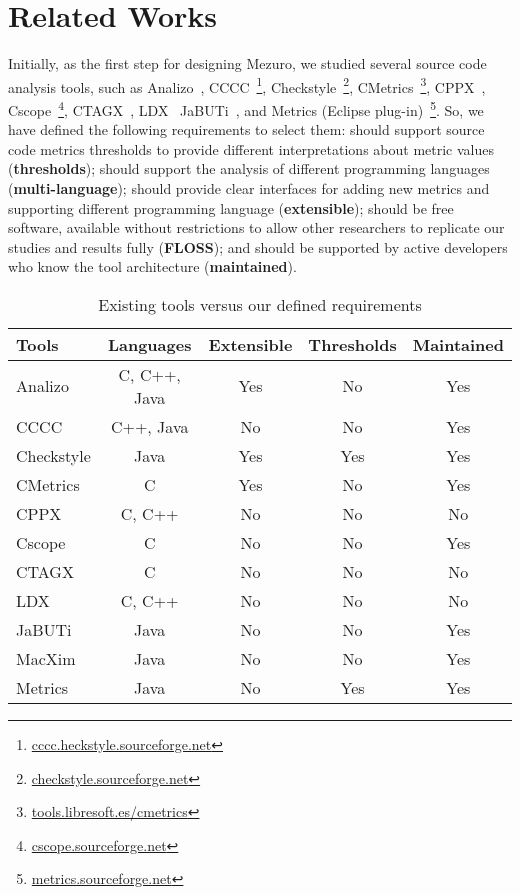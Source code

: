 \section{Related Works}
\label{sec:related_works}

Initially, as the first step for designing Mezuro, we studied several source
code analysis tools, such as
%
Analizo~\cite{analizo}, CCCC~\footnote{\url{cccc.heckstyle.sourceforge.net}},
Checkstyle~\footnote{\url{checkstyle.sourceforge.net}},
CMetrics~\footnote{\url{tools.libresoft.es/cmetrics}}, CPPX~\cite{hassan2005},
Cscope~\footnote{\url{cscope.sourceforge.net}}, CTAGX~\cite{hassan2005},
LDX~\cite{hassan2005} JaBUTi~\cite{jabuti}, and Metrics (Eclipse
plug-in)~\footnote{\url{metrics.sourceforge.net}}.
%
So, we have defined the following requirements to select them: should
support source code metrics thresholds to provide different interpretations
about metric values (\textbf{thresholds}); should support the analysis of different programming
languages (\textbf{multi-language}); should provide clear interfaces for adding new metrics and
supporting different programming language (\textbf{extensible}); should be free software,
available without restrictions to allow other researchers to replicate our
studies and results fully (\textbf{FLOSS}); and should be supported by active developers who
know the tool architecture (\textbf{maintained}).

\begin{table}[htb]
  \centering
{}
  \begin{tabular}{|l|c|c|c|c|}
    \hline
    \textbf{Tools} &
    \textbf{Languages} & %
    \textbf{Extensible} & %
    \textbf{Thresholds} & %
    \textbf{Maintained} \\\hline\hline %

    Analizo 	& C, C++, Java & Yes & No  & Yes    \\\hline
    CCCC 	& C++, Java    & No  & No  & Yes    \\\hline
    Checkstyle	& Java         & Yes  & Yes & Yes    \\\hline
    CMetrics	& C            & Yes & No  & Yes    \\\hline
    CPPX	& C, C++       & No  & No  & No     \\\hline
    Cscope	& C            & No  & No  & Yes    \\\hline
    CTAGX	& C            & No  & No  & No     \\\hline
    LDX		& C, C++       & No  & No  & No     \\\hline
    JaBUTi	& Java         & No  & No  & Yes    \\\hline
    MacXim	& Java         & No  & No  & Yes    \\\hline
    Metrics 	& Java         & No  & Yes & Yes    \\\hline

  \end{tabular}
  \caption{Existing tools versus our defined requirements}
  \label{tab:tools}
\end{table}

